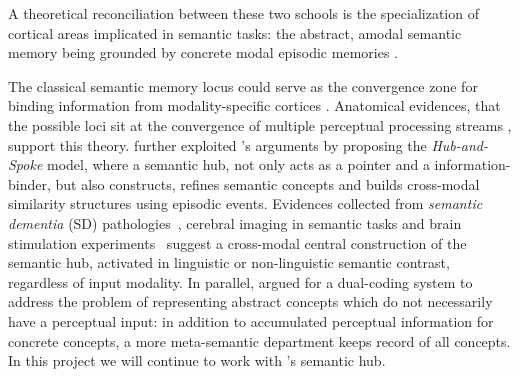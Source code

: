 A theoretical reconciliation between these two schools is the specialization of cortical areas implicated in semantic tasks: the abstract, amodal semantic memory being grounded by concrete modal episodic memories \parencite{pecherGroundingCognitionRole2005}. 

The classical semantic memory locus could serve as the convergence zone for binding information from modality-specific cortices \parencite{damasioNeuralBasisLexical1996, damasioNeuralSystemsWord2004, simmonsSimilarityintopographyPrincipleReconciling2003}. Anatomical evidences, that the possible loci sit at the convergence of multiple perceptual processing streams \parencite{binderNeurobiologySemanticMemory2011}, support this theory. \textcite{pattersonWhereYouKnow2007} further exploited \citeauthor{damasioNeuralSystemsWord2004}'s arguments by proposing the \emph{Hub-and-Spoke} model, where a semantic hub, not only acts as a pointer and a information-binder, but also constructs, refines semantic concepts and builds cross-modal similarity structures using episodic events. Evidences collected from \emph{semantic dementia} (SD) pathologies~\parencite{nestorDeclarativeMemoryImpairments2006}, cerebral imaging in semantic tasks and brain stimulation experiments~\parencite{pobricCategorySpecificCategoryGeneralSemantic2010} suggest a cross-modal central construction of the semantic hub, activated in linguistic or non-linguistic semantic contrast, regardless of input modality. In parallel, \textcite{paivioMindItsEvolution2008} argued for a dual-coding system to address the problem of representing abstract concepts which do not necessarily have a perceptual input: in addition to accumulated perceptual information for concrete concepts, a more meta-semantic department keeps record of all concepts. In this project we will continue to work with \citeauthor{pattersonWhereYouKnow2007}'s semantic hub.


